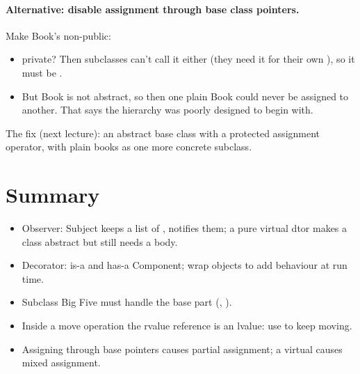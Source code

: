 \paragraph{Alternative: disable assignment through base class pointers.} Make
Book's  non-public:
\begin{itemize}
  \item private? Then subclasses can't call it either (they need it for their
        own ), so it must be .
  \item But Book is not abstract, so then one plain Book could never be assigned
        to another. That says the hierarchy was poorly designed to begin with.
\end{itemize}
The fix (next lecture): an abstract base class with a protected assignment
operator, with plain books as one more concrete subclass.

\section*{Summary}
\begin{itemize}
  \item Observer: Subject keeps a list of , notifies them; a pure
        virtual dtor makes a class abstract but still needs a body.
  \item Decorator: is-a and has-a Component; wrap objects to add behaviour at run
        time.
  \item Subclass Big Five must handle the base part (,
        ).
  \item Inside a move operation the rvalue reference is an lvalue: use
         to keep moving.
  \item Assigning through base pointers causes partial assignment; a virtual
         causes mixed assignment.
\end{itemize}
